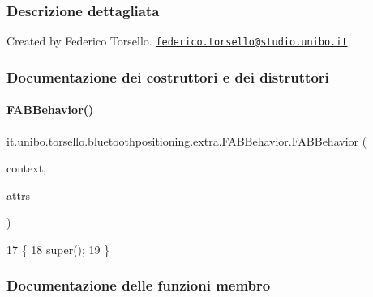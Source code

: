 \subsubsection{Descrizione dettagliata}
Created by Federico Torsello. \href{mailto:federico.torsello@studio.unibo.it}{\tt federico.\+torsello@studio.\+unibo.\+it} 

\subsubsection{Documentazione dei costruttori e dei distruttori}
\hypertarget{classit_1_1unibo_1_1torsello_1_1bluetoothpositioning_1_1extra_1_1FABBehavior_ae703e3a3d6d647561f7b41a0eb94a9f0_ae703e3a3d6d647561f7b41a0eb94a9f0}{}\label{classit_1_1unibo_1_1torsello_1_1bluetoothpositioning_1_1extra_1_1FABBehavior_ae703e3a3d6d647561f7b41a0eb94a9f0_ae703e3a3d6d647561f7b41a0eb94a9f0} 
\paragraph{\texorpdfstring{F\+A\+B\+Behavior()}{FABBehavior()}}
{\footnotesize\ttfamily it.\+unibo.\+torsello.\+bluetoothpositioning.\+extra.\+F\+A\+B\+Behavior.\+F\+A\+B\+Behavior (\begin{DoxyParamCaption}\item[{Context}]{context,  }\item[{Attribute\+Set}]{attrs }\end{DoxyParamCaption})}


\begin{DoxyCode}
17                                                             \{
18         super();
19     \}
\end{DoxyCode}


\subsubsection{Documentazione delle funzioni membro}
\hypertarget{classit_1_1unibo_1_1torsello_1_1bluetoothpositioning_1_1extra_1_1FABBehavior_ab4208eb2a50a8e79e0a80089f398a5b9_ab4208eb2a50a8e79e0a80089f398a5b9}{}\label{classit_1_1unibo_1_1torsello_1_1bluetoothpositioning_1_1extra_1_1FABBehavior_ab4208eb2a50a8e79e0a80089f398a5b9_ab4208eb2a50a8e79e0a80089f398a5b9} 
